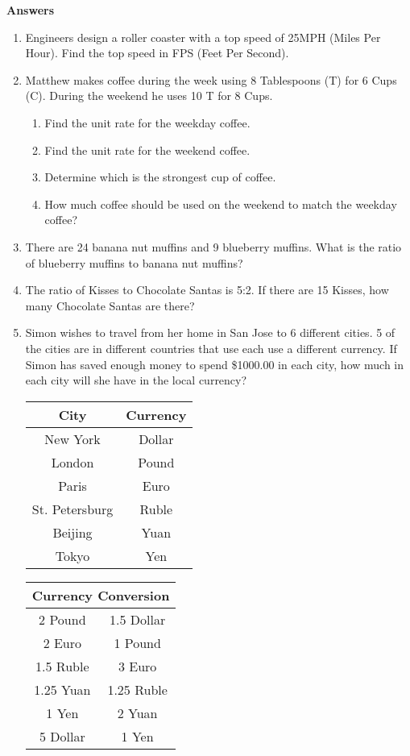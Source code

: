 \documentclass[12pt]{article}
\begin{document}
\large

\textbf{ Answers }

\begin{enumerate}
\item Engineers design a roller coaster with a top speed of 25MPH (Miles Per Hour).  Find the top speed in FPS (Feet Per Second).


\item Matthew makes coffee during the week using 8 Tablespoons (T) for 6 Cups (C).  During the weekend he uses 10 T for 8 Cups.
	\begin{enumerate}
		\item Find the unit rate for the weekday coffee.
		\item Find the unit rate for the weekend coffee.
		\item Determine which is the strongest cup of coffee.
		\item How much coffee should be used on the weekend to match the weekday coffee?
	\end{enumerate}

\item There are 24 banana nut muffins and 9 blueberry muffins.  What is the ratio of blueberry muffins to banana nut muffins?

\item The ratio of Kisses to Chocolate Santas is 5:2.  If there are 15 Kisses, how many Chocolate Santas are there?

\item Simon wishes to travel from her home in San Jose to 6 different cities.  5 of the cities are in different countries that use each use a different currency.  If Simon has saved enough money to spend \$1000.00 in each city, how much in each city will she have in the local currency?

	\begin{tabular}{ | c | c | }
	\hline
	\bf{City} & \bf{Currency} \\ \hline \hline
	New York & Dollar \\ \hline
	London & Pound \\ \hline
	Paris & Euro \\ \hline
	St. Petersburg & Ruble \\ \hline
	Beijing & Yuan \\ \hline
	Tokyo & Yen \\ \hline
	\hline
	\end{tabular}

	\begin{tabular}{ | c | c | }
	\hline
	\multicolumn{2}{|c|}{\bf{Currency Conversion}} \\ \hline \hline
	2 Pound & 1.5 Dollar \\ \hline
	2 Euro & 1 Pound \\ \hline
	1.5 Ruble & 3 Euro \\ \hline
	1.25 Yuan & 1.25 Ruble \\ \hline
	1 Yen & 2 Yuan \\ \hline
	5 Dollar & 1 Yen \\ \hline
	\hline
	\end{tabular}

\end{enumerate}
\end{document}
